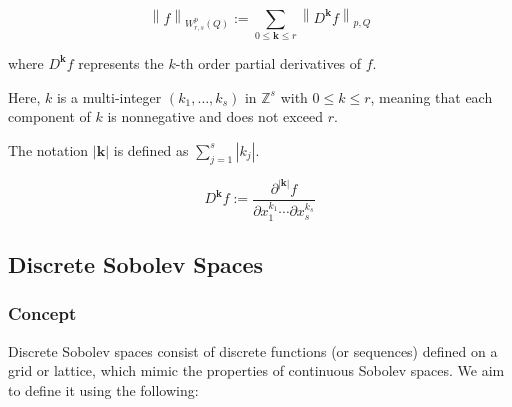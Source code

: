 \documentclass{article}
\begin{document}
\[ \left\| f \right\|_{W^{p}_{r,s}(Q)} := \sum_{0 \leq \mathbf{k} \leq r} \left\| D^{\mathbf{k}} f \right\|_{p,Q} \]

where \( D^{\mathbf{k}} f \) represents the \( k \)-th order partial derivatives of \( f \).

Here, \( k \) is a multi-integer \( (k_1, \ldots, k_s) \) in \( \mathbb{Z}^s \) with \( 0 \leq k \leq r \), meaning that each component of \( k \) is nonnegative and does not exceed \( r \). 

The notation \( |\mathbf{k}| \) is defined as \( \sum_{j=1}^s |k_j| \).

\[ D^{\mathbf{k}} f :=  \frac{\partial^{|\mathbf{k}|} f}{\partial x_1^{k_1} \cdots \partial x_s^{k_s}} \]

\subsection{Discrete Sobolev Spaces}

\subsubsection*{Concept}
Discrete Sobolev spaces consist of discrete functions (or sequences) defined on a grid or lattice, which mimic the properties of continuous Sobolev spaces. We aim to define it using the following:
\end{document}
